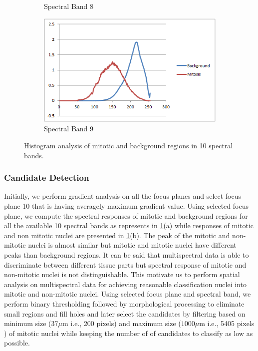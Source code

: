 \documentclass[10pt,twocolumn,letterpaper]{article}
\begin{document}
\begin{figure}[b]
\begin{subfigure}[b]{0.22\textwidth}
		\caption*{Spectral Band 8}
	\end{subfigure}
	\begin{subfigure}[b]{0.22\textwidth}
		\includegraphics[width=\textwidth]{diagrams/Band9.png}
		\caption*{Spectral Band 9}
	\end{subfigure}
	\caption{Histogram analysis of mitotic and background regions in 10 spectral bands.}
	\label{fig:bands_histogram}	
\end{figure}

\subsubsection{Candidate Detection}
Initially, we perform gradient analysis on all the focus planes and select focus plane 10 that is having averagely maximum gradient value. Using selected focus plane, we compute the spectral responses of mitotic and background regions for all the available 10 spectral bands as represents in \ref{fig:bands_histogram}(a) while responses of mitotic and non mitotic nuclei are presented in \ref{fig:bands_histogram}(b). The peak of the mitotic and non-mitotic nuclei is almost similar but mitotic and mitotic nuclei have different peaks than background regions. It can be said that multispectral data is able to discriminate between different tissue parts but spectral response of mitotic and non-mitotic nuclei is not distinguishable. This motivate us to perform spatial analysis on multispectral data for achieving reasonable classification nuclei into mitotic and non-mitotic nuclei. Using selected focus plane and spectral band, we perform binary thresholding followed by morphological processing to eliminate small regions and fill holes and later select the candidates by filtering based on minimum size ($37\mu\text{m}$ i.e., 200 pixels) and maximum size ($1000\mu\text{m}$ i.e., 5405 pixels ) of mitotic nuclei while keeping the number of of candidates to classify as low as possible. 
\end{document}
